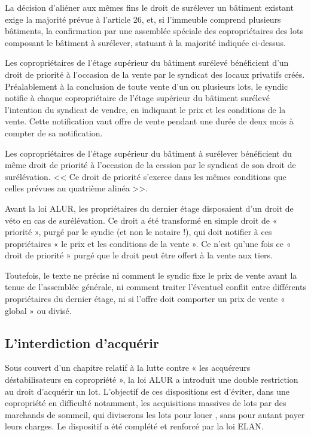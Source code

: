			La décision d’aliéner aux mêmes fins le droit de surélever un bâtiment existant exige la majorité prévue à
			l’article 26, et, si l’immeuble comprend plusieurs bâtiments, la confirmation par une assemblée spéciale
			des copropriétaires des lots composant le bâtiment à surélever, statuant à la majorité indiquée ci-dessus.
			
			Les copropriétaires de l'étage supérieur du bâtiment surélevé bénéficient d'un droit de priorité à l'occasion
			de la vente par le syndicat des locaux privatifs créés. Préalablement à la conclusion de toute vente d'un ou
			plusieurs lots, le syndic notifie à chaque copropriétaire de l'étage supérieur du bâtiment surélevé l'intention
			du syndicat de vendre, en indiquant le prix et les conditions de la vente. Cette notification vaut offre de
			vente pendant une durée de deux mois à compter de sa notification.
			
			Les copropriétaires de l'étage supérieur du bâtiment à surélever bénéficient du même droit de priorité à
			l'occasion de la cession par le syndicat de son droit de surélévation. << Ce droit de priorité s'exerce dans les
			mêmes conditions que celles prévues au quatrième alinéa >>.
			
			\bigskip
			Avant la loi ALUR, les propriétaires du dernier étage disposaient d’un droit de véto en cas de surélévation.
			Ce droit a été transformé en simple droit de « priorité », purgé par le syndic (et non le notaire !), qui doit
			notifier à ces propriétaires « le prix et les conditions de la vente ». Ce n’est qu’une fois ce « droit de
			priorité » purgé que le droit peut être offert à la vente aux tiers.
			
			Toutefois, le texte ne précise ni comment le syndic fixe le prix de vente avant la tenue de l’assemblée
			générale, ni comment traiter l’éventuel conflit entre différents propriétaires du dernier étage, ni si l’offre
			doit comporter un prix de vente « global » ou divisé.
	
	\subsection{L’interdiction d’acquérir}
	
		Sous couvert d’un chapitre relatif à la lutte contre « les acquéreurs déstabilisateurs en copropriété », la loi
		ALUR a introduit une double restriction au droit d’acquérir un lot. L’objectif de ces dispositions est
		d’éviter, dans une copropriété en difficulté notamment, les acquisitions massives de lots par des
		marchands de sommeil, qui diviserons les lots pour louer , sans pour autant payer leurs charges.
		Le dispositif a été complété et renforcé par la loi ELAN.
		
